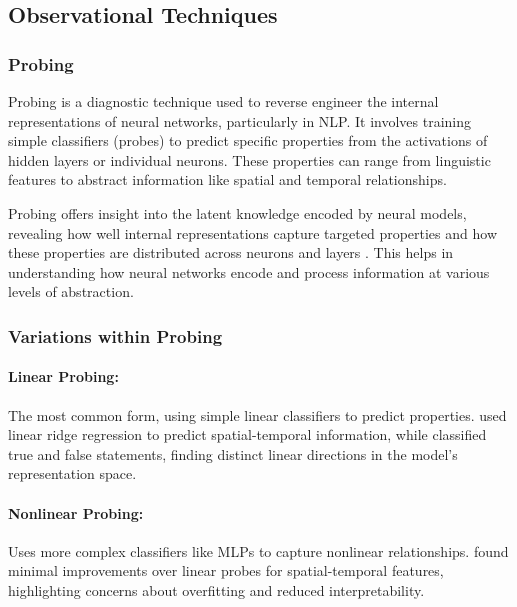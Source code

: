 \documentclass[sigconf,authoryear]{acmart}
\begin{document}
\subsection{Observational Techniques} 
\subsubsection{Probing} 

Probing is a diagnostic technique used to reverse engineer the internal representations of neural networks, particularly in NLP. It involves training simple classifiers (probes) to predict specific properties from the activations of hidden layers or individual neurons. These properties can range from linguistic features to abstract information like spatial and temporal relationships.

Probing offers insight into the latent knowledge encoded by neural models, revealing how well internal representations capture targeted properties and how these properties are distributed across neurons and layers \citep{zhao2023explainabilitylargelanguagemodels, bolukbasi2021interpretabilityillusionbert}. This helps in understanding how neural networks encode and process information at various levels of abstraction.

\subsubsection{Variations within Probing}

\paragraph{Linear Probing:} The most common form, using simple linear classifiers to predict properties. \citet{gurnee2024languagemodelsrepresentspace} used linear ridge regression to predict spatial-temporal information, while \citet{marks2024geometrytruthemergentlinear} classified true and false statements, finding distinct linear directions in the model's representation space.

\paragraph{Nonlinear Probing:} Uses more complex classifiers like MLPs to capture nonlinear relationships. \citet{gurnee2024languagemodelsrepresentspace} found minimal improvements over linear probes for spatial-temporal features, highlighting concerns about overfitting and reduced interpretability.
\end{document}
